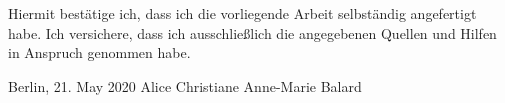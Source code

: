 Hiermit bestätige ich, dass ich die vorliegende Arbeit selbständig angefertigt habe. Ich versichere, dass ich ausschließlich die angegebenen Quellen und Hilfen in Anspruch genommen habe.
\par
Berlin, 21. May 2020 \hfill Alice Christiane Anne-Marie Balard
